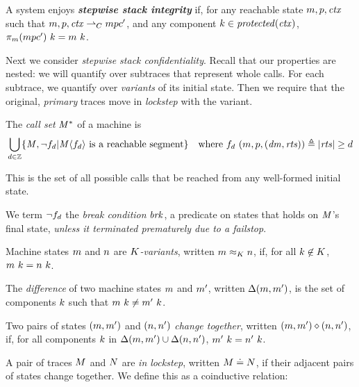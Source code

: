 \documentclass[acmsmall,review,anonymous]{acmart}\settopmatter{printfolios=true,printccs=false,printacmref=false}
\begin{document}
{{
A system enjoys \textit{\textbf{stepwise stack integrity}} if, for any reachable state
\(m,p,\mathit{ctx}\) such that \(m,p,\mathit{ctx} \overset{}{\rightharpoonup}_C mpc'\),
and any component \(k \in \mathit{protected}(\mathit{ctx})\),
\(\pi_m(mpc') ~ k = m ~ k\).

Next we consider {\em stepwise stack confidentiality}. Recall that our properties are
nested: we will quantify over subtraces that represent whole calls. For each
subtrace, we quantify over {\em variants} of its initial state. Then we require
that the original, {\em primary} traces move in {\em lockstep} with the variant.

 The \emph{call set} \(\mathit{M}^*\) of a machine is
\[\begin{aligned}
\bigcup_{d \in \mathbb{Z}} \{\mathit{M}, \neg f_d | \mathit{M}\langle f_d \rangle
\text{ is a reachable segment}\} \hspace{1em} &
\text{where } f_d ~ (m,p,(\mathit{dm},\mathit{rts})) \triangleq |\mathit{rts}| \geq d \\
\end{aligned}\]

This is the set of all possible calls that be reached from any well-formed initial state.

We term \(\neg f_d\) the {\em break condition} \(\mathit{brk}\), a predicate on
states that holds on \(\mathit{M}\)'s final state, {\em unless it terminated prematurely due to a failstop}.

 Machine states \(m\) and \(n\) are {\em \(K\)-variants},
written \(m \approx_K n\), if, for
all \(k \not \in K\), \(m ~ k = n ~ k\).

 The \emph{difference} of two machine states \(m\) and \(m'\), written \(\Delta(m,m')\),
is the set of components \(k\)
such that \(m ~ k \not = m' ~ k\).

 Two pairs of states \((m,m')\) and \((n,n')\)
 {\em change together}, written \((m,m') \diamond (n,n')\), if, for all components \(k\) in
\(\Delta(m,m') \cup \Delta(n,n')\),
\(m' ~ k = n' ~ k\).

 A pair of traces \(M\) and \(N\) are {\em in lockstep},
written \(M \doteq N\),
if their adjacent pairs of states change together.  We define this as a coinductive relation:

}}
\end{document}
